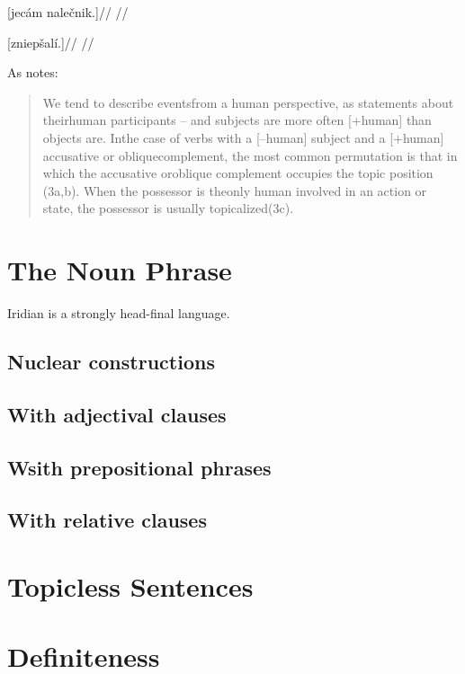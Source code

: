 \a
\begingl
\gla \relax[Tereza] [jec\'am nale\v{c}nik.]//
\glft {}//
\endgl

\a
\begingl
\gla \relax[Shl\'ed] [zniep\v{s}al\'i.]//
\glft {}//
\endgl

\xe

As \textcite[9]{kiss2004} notes:

\begin{quote}
  We tend to describe eventsfrom a human perspective, as statements about theirhuman participants – and subjects are more often [+human] than objects are. Inthe case of verbs with a [–human] subject and a [+human] accusative or obliquecomplement,  the  most  common  permutation  is  that  in  which  the  accusative  oroblique complement occupies the topic position (3a,b). When the possessor is theonly human involved in an action or state, the possessor is usually topicalized(3c).
\end{quote}

\section{The Noun Phrase}

Iridian is a strongly head-final language.

\subsection{Nuclear constructions}
\subsection{With adjectival clauses}
\subsection{Wsith prepositional phrases}
\subsection{With relative clauses}

\section{Topicless Sentences}\label{sec:topicless}

\section{Definiteness}\label{sec:definiteness}

